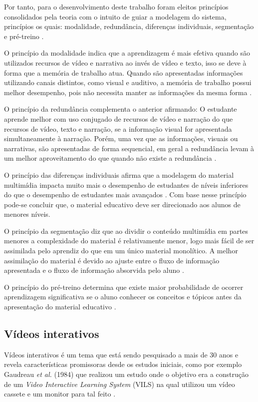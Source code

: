 Por tanto, para o desenvolvimento deste trabalho foram eleitos princípios consolidados pela teoria com o intuito de guiar a modelagem do sistema, princípios os quais: modalidade, redundância, diferenças individuais, segmentação e pré-treino \cite{clark2011, mayer2001, moreno2000}.

O princípio da modalidade indica que a aprendizagem é mais efetiva quando são utilizados recursos de vídeo e narrativa ao invés de vídeo e texto, isso se deve à forma que a memória de trabalho atua. Quando são apresentadas informações utilizando canais distintos, como visual e auditivo, a memória de trabalho possui melhor desempenho, pois não necessita manter as informações da mesma forma \cite{mayer2001}. 

O princípio da redundância complementa o anterior afirmando: O estudante aprende melhor com uso conjugado de recursos de vídeo e narração do que recursos de vídeo, texto e narração, se a informação visual for apresentada simultaneamente à narração. Porém, uma vez que as informações, visuais ou narrativas, são apresentadas de forma sequencial, em geral a redundância levam à um melhor aproveitamento do que quando não existe a redundância \cite{moreno2000}.

O  princípio  das  diferenças  individuais  afirma  que  a  modelagem  do  material multimídia impacta muito mais o desempenho de estudantes de níveis inferiores do que o desempenho de estudantes mais avançados \cite{mayer2001}. Com base nesse princípio pode-se concluir que, o material educativo deve ser direcionado aos alunos de menores níveis.

O princípio da segmentação diz que ao dividir o conteúdo multimídia em partes menores a complexidade do material é relativamente menor, logo mais fácil de ser assimilada pelo aprendiz do que em um único material monolítico. A melhor assimilação do material é devido ao ajuste entre o fluxo de informação apresentada e o fluxo de informação absorvida pelo aluno \cite{mayer2001, moreno2000}.

O princípio do pré-treino determina que existe maior probabilidade de ocorrer aprendizagem significativa se o aluno conhecer os conceitos e tópicos antes da apresentação do material educativo \cite{mayer2001, moreno2000}.

\subsection{Vídeos interativos}

Vídeos interativos é um tema que está sendo pesquisado a mais de 30 anos e revela características promissoras desde os estudos iniciais, como por exemplo Gaudreau \textit{et al.} (1984) que realizou um estudo onde o objetivo era a construção de um \textit{Video Interactive Learning System} (VILS) na qual utilizou um vídeo cassete e um monitor para tal feito \cite{gaudreau1984}.

